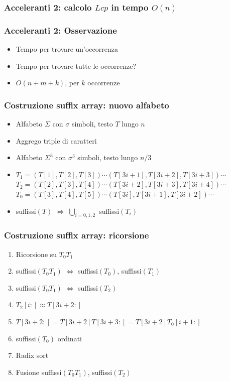 \begin{frame}[fragile]
\frametitle{Acceleranti 2: calcolo $Lcp$ in tempo $O(n)$}
\end{frame}

\begin{frame}
\frametitle{Acceleranti 2: Osservazione}
\begin{itemize}[<+->]
\item
Tempo per trovare un'occorrenza
\item
Tempo per trovare tutte le occorrenze?
\item
$O(n+m+k)$, per $k$ occorrenze
\end{itemize}
\end{frame}

\begin{frame}
\frametitle{Costruzione suffix array: nuovo alfabeto}
\begin{itemize}
\item
Alfabeto $\Sigma$ con $\sigma$ simboli, testo $T$ lungo $n$
\item
Aggrego triple di caratteri
\item
Alfabeto $\Sigma^{3}$ con $\sigma^{3}$ simboli, testo lungo $n/3$
\item
$T_{1}=(T[1],T[2],T[3])\cdots (T[3i+1],T[3i+2],T[3i+3])\cdots$\\
$T_{2}=(T[2],T[3],T[4])\cdots (T[3i+2],T[3i+3],T[3i+4])\cdots$\\
$T_{0}=(T[3],T[4],T[5])\cdots (T[3i],T[3i+1],T[3i+2])\cdots$
\item
suffissi$(T)$ $\Leftrightarrow$ $\bigcup_{i=0,1,2}$ suffissi$(T_{i})$
\end{itemize}
\end{frame}

\begin{frame}
\frametitle{Costruzione suffix array: ricorsione}
\begin{enumerate}
\item
Ricorsione su $T_{0}T_{1}$
\item
suffissi$(T_{0}T_{1})$ $\Leftrightarrow$ suffissi$(T_{0})$, suffissi$(T_{1})$
\item
suffissi$(T_{0}T_{1})$  $\Leftrightarrow$ suffissi$(T_{2})$
\item
$T_{2}[i:] \approx T[3i+2:]$
\item
$T[3i+2:] = T[3i+2]T[3i+3:] =T[3i+2]T_{0}[i+1:]$
\item
suffissi$(T_{0})$ ordinati
\item
Radix sort
\item
Fusione suffissi$(T_{0}T_{1})$,  suffissi$(T_{2})$
\end{enumerate}
\end{frame}

